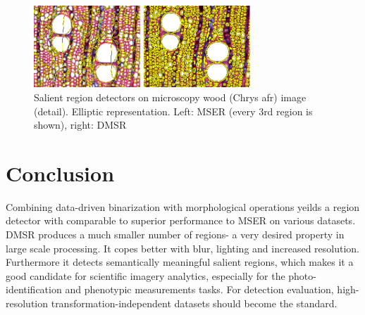 \documentclass[conference,compsoc]{IEEEtran}
\begin{document}
\begin{figure}[htb]
\begin{minipage}[b]{.49\linewidth}
  \centering
  \centerline{\includegraphics[width=4cm]{mser_wood_C}}
\end{minipage}
\hfill
\begin{minipage}[b]{0.49\linewidth}
  \centering
  \centerline{\includegraphics[width=4cm]{dmsr_wood_C}}
\end{minipage}
\vspace{-0.25cm}
\caption{Salient region detectors on microscopy wood (Chrys afr) image (detail). Elliptic representation. Left: MSER (every $3$rd region is shown), right: DMSR}
\label{fig:wood_C}

\end{figure}

\section{Conclusion}

Combining data-driven binarization with morphological operations yeilds a region detector with comparable to superior performance to MSER on various datasets. DMSR produces a much smaller number of regions- a very desired property in large scale processing. It copes better with blur, lighting and increased resolution. Furthermore it detects semantically meaningful salient regions, which makes it a good candidate for scientific imagery analytics, especially for the photo-identification and phenotypic measurements tasks. For detection evaluation, high-resolution transformation-independent datasets should become the standard.
\end{document}
